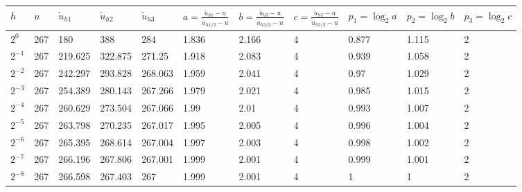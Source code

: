 \documentclass[10pt, a4paper, onecolumn, oneside, final]{report}
\begin{document}
\begin{table}[H]
\centering
\begin{tabular}{@{}lllllllllll@{}}
\hline
$h$  & $u$   & $\tilde{u}_{h1}$        & $\tilde{u}_{h2}$        & $\tilde{u}_{h3}$        & $a = \frac{\tilde{u}_{h1} - u}{\tilde{u}_{h1/2} - u}$             & $b = \frac{\tilde{u}_{h3} - u}{\tilde{u}_{h3/2} - u}$             & $c = \frac{\tilde{u}_{h3} - u}{\tilde{u}_{h3/2} - u}$ & $p_1 = \log_2{a}$            & $p_2 = \log_2{b}$           & $p_3 = \log_2{c}$           \\ \hline
$2^{0}$                   & 267                    & 180     & 388     & 284     & 1.836                     & 2.166                     & 4  & 0.877                       & 1.115                       & 2    \\
$2^{-1}$                   & 267                    & 219.625 & 322.875 & 271.25  & 1.918                     & 2.083                     & 4  & 0.939                       & 1.058                       & 2    \\
$2^{-2}$                   & 267                    & 242.297 & 293.828 & 268.063 & 1.959                     & 2.041                     & 4  & 0.97 & 1.029                       & 2    \\
$2^{-3}$                   & 267                    & 254.389 & 280.143 & 267.266 & 1.979                     & 2.021                     & 4  & 0.985                       & 1.015                       & 2    \\
$2^{-4}$                   & 267                    & 260.629 & 273.504 & 267.066 & 1.99                      & 2.01                      & 4  & 0.993                       & 1.007                       & 2    \\
$2^{-5}$                   & 267                    & 263.798 & 270.235 & 267.017 & 1.995                     & 2.005                     & 4  & 0.996                       & 1.004                       & 2    \\
$2^{-6}$                   & 267                    & 265.395 & 268.614 & 267.004 & 1.997                     & 2.003                     & 4  & 0.998                       & 1.002                       & 2    \\
$2^{-7}$                   & 267                    & 266.196 & 267.806 & 267.001 & 1.999                     & 2.001                     & 4  & 0.999                       & 1.001                       & 2    \\
$2^{-8}$                   & 267                    & 266.598 & 267.403 & 267     & 1.999                     & 2.001                     & 4  & 1    & 1    & 2    \\

\end{tabular}
\end{table}
\end{document}
